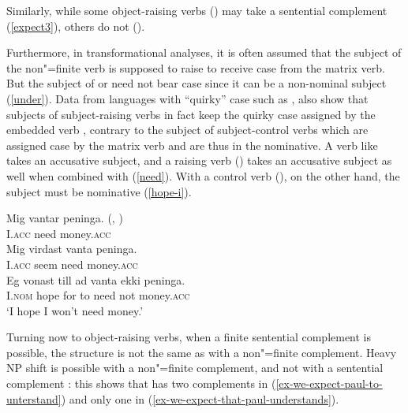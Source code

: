 \documentclass[output=paper
	        ,collection
	        ,collectionchapter
 	        ,biblatex
                ,babelshorthands
                ,newtxmath
                ,draftmode
                ,colorlinks, citecolor=brown
]{langscibook}
\begin{document}
\eal
{}
\zl
 
Similarly, while some object-raising verbs () may take a sentential complement (\ref{expect3}), others do not ().
 
\eal
{}
\zl
\eal
{}
\zl

Furthermore, in transformational analyses, it is often assumed that the subject of the non"=finite verb  is supposed to raise to receive case from the matrix verb.
 But the subject of  or  need not bear case  since it can be a non-nominal subject (\ref{under}).
Data from languages with ``quirky'' case such as , also show that subjects of subject-raising verbs in fact keep the quirky case assigned by the embedded verb  \citep{Zaenenetal1985}, contrary to the subject of subject-control verbs which are assigned case by the matrix verb and are thus in the nominative. A verb like  takes an accusative subject, and a raising verb () takes an accusative subject as well when combined with  (\ref{need}). With a control verb (), on the other hand, the subject must be nominative (\ref{hope-i}).

\eal
\ex 
\gll Mig vantar peninga. (, \citealp[--139]{PollardandSag1994})\\
     I.\textsc{acc} need money.\textsc{acc} \\
\ex 
\gll Mig virdast vanta peninga. \label{need} \\
     I.\textsc{acc} seem need money.\textsc{acc} \\
\ex 
\gll Eg vonast till ad vanta ekki peninga. \label{hope-i} \\
     I.\textsc{nom} hope for to need not money.\textsc{acc} \\
\glt `I hope I won't need money.'
\zl

Turning now to object-raising verbs, when a finite sentential complement is possible, the structure
is not the same as  with a non"=finite complement. Heavy NP shift is possible with a non"=finite
complement, and not with a sentential complement \parencites[]{Bresnan1982}{PollardandSag1994}\addpages: this shows that  has two complements in (\ref{ex-we-expect-paul-to-unterstand}) and only one in (\ref{ex-we-expect-that-paul-understands}).
\end{document}
